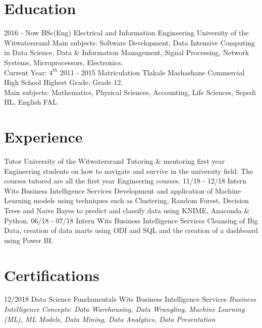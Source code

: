 \documentclass[]{friggeri-cv}
\DeclareRobustCommand{\hlcyan}[1]{{\sethlcolor{cyan}\hl{#1}}}
\begin{document}
\section{Education}
\begin{entrylist}
    \entry
    {2016 - Now}
    { BSc(Eng) Electrical and Information Engineering}
    {University of the Witwatersrand}
    {Main subjects: Software Development, Data Intensive Computing in Data Science, Data \& Information Management, Signal Processing, Network Systems, Microprocessors, Electronics.\\
    Current Year: $4^{th}$}
  \entry
    {2011 - 2015}
    {Matriculation}
    {Tlakale Mashashane Commercial High School }
    {Highest Grade: Grade 12.\\
    Main subjects: Mathematics, Physical Sciences, Accounting, Life Sciences, Sepedi HL, English FAL}
\end{entrylist}

\section{Experience}
\begin{entrylist}
        {Tutor}
        {University of the Witwatersrand}
        {Tutoring \& mentoring first year Engineering students on how to navigate and survive in the university field. The courses tutored are all the first year Engineering courses. }
  \entry
    {11/18 - 12/18}%
    {Intern}
    {Wits Business Intelligence Services}
    {Development and application of Machine Learning models using techniques such as Clustering, Random Forest, Decision Trees and Naive Bayes to predict and classify data using KNIME, Anaconda \& Python.}
  \entry
    {06/18 - 07/18}%
    {Intern}
    {Wits Business Intelligence Services}
    {Cleansing of Big Data, creation of data marts using ODI and SQL and the creation of a dashboard using Power BI.}
\end{entrylist}



\section{Certifications}
\begin{entrylist}
  \entry
    {12/2018}
    {Data Science Fundamentals}
    {Wits Business Intelligence Services}
    {\emph{Business Intelligence Concepts: Data Warehousing, Data Wrangling, Machine Learning (ML), ML Models, Data Mining, Data Analytics, Data Presentation}}
\end{entrylist}
\end{document}

